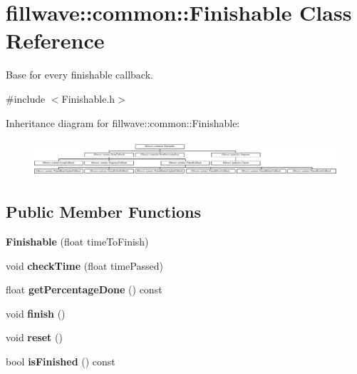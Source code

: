 \hypertarget{classfillwave_1_1common_1_1Finishable}{}\section{fillwave\+:\+:common\+:\+:Finishable Class Reference}
\label{classfillwave_1_1common_1_1Finishable}


Base for every finishable callback.  




{\ttfamily \#include $<$Finishable.\+h$>$}

Inheritance diagram for fillwave\+:\+:common\+:\+:Finishable\+:\begin{figure}[H]
\begin{center}
\leavevmode
\includegraphics[height=1.377614cm]{classfillwave_1_1common_1_1Finishable}
\end{center}
\end{figure}
\subsection*{Public Member Functions}
\begin{DoxyCompactItemize}
\item 
\hypertarget{classfillwave_1_1common_1_1Finishable_a4e82504fc8af19c480170ec836d0b400}{}{\bfseries Finishable} (float time\+To\+Finish)\label{classfillwave_1_1common_1_1Finishable_a4e82504fc8af19c480170ec836d0b400}

\item 
\hypertarget{classfillwave_1_1common_1_1Finishable_aecc37f0d5ed793ab1f446a6d11e8b29d}{}void {\bfseries check\+Time} (float time\+Passed)\label{classfillwave_1_1common_1_1Finishable_aecc37f0d5ed793ab1f446a6d11e8b29d}

\item 
\hypertarget{classfillwave_1_1common_1_1Finishable_a75db5fbcb2651c9a1a05a8ebf3978038}{}float {\bfseries get\+Percentage\+Done} () const \label{classfillwave_1_1common_1_1Finishable_a75db5fbcb2651c9a1a05a8ebf3978038}

\item 
\hypertarget{classfillwave_1_1common_1_1Finishable_a1b5ad3219468ddaa449f3330b2aa660c}{}void {\bfseries finish} ()\label{classfillwave_1_1common_1_1Finishable_a1b5ad3219468ddaa449f3330b2aa660c}

\item 
\hypertarget{classfillwave_1_1common_1_1Finishable_a79a1f23e168c734489973ce8cf2c373b}{}void {\bfseries reset} ()\label{classfillwave_1_1common_1_1Finishable_a79a1f23e168c734489973ce8cf2c373b}

\item 
\hypertarget{classfillwave_1_1common_1_1Finishable_a14fdfaf4574f50dd27723d1ea50a3276}{}bool {\bfseries is\+Finished} () const \label{classfillwave_1_1common_1_1Finishable_a14fdfaf4574f50dd27723d1ea50a3276}

\end{DoxyCompactItemize}
